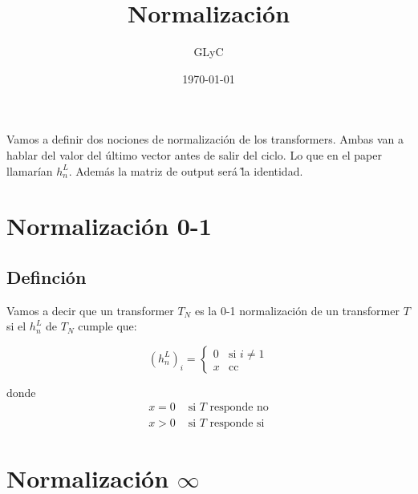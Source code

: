 \documentclass{article}
\title{Normalización}
\author{GLyC}
\date{\today}
\begin{document}
\maketitle

Vamos a definir dos nociones de normalización de los transformers. Ambas van a hablar del valor del último vector antes de salir del ciclo. Lo que en el paper llamarían $h_n^L$. Además la matriz de output será \~ la identidad.

\section*{Normalización 0-1}

\subsection*{Definción}

Vamos a decir que un transformer $T_N$ es la 0-1 normalización de un transformer $T$ si el $h_n^L$ de $T_N$ cumple que:

\begin{equation*}
(h_n^L)_i =
\begin{cases}
0 & \text{si } i \neq 1 \\
x & \text{cc }
\end{cases}
\end{equation*}

donde 
\begin{align*}
    x = 0 & \text{ si $T$ responde no} \\
    x > 0 & \text{ si $T$ responde si}
\end{align*}






\section*{Normalización $\infty$}
\end{document}
